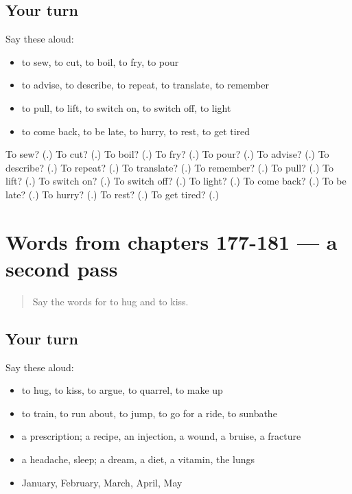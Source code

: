 \subsection*{Your turn}
Say these aloud:

\begin{itemize}
\raggedright
  \item to sew, to cut, to boil, to fry, to pour
  \item to advise, to describe, to repeat, to translate, to remember
  \item to pull, to lift, to switch on, to switch off, to light
  \item to come back, to be late, to hurry, to rest, to get tired
\end{itemize}

\begin{tcolorbox}[breakable,colback=teal!4,colframe=teal!35!black,title={Before you move on}]
To sew? (\textbf{}.) To cut? (\textbf{}.) To boil? (\textbf{}.) To fry? (\textbf{}.) To pour? (\textbf{}.) To advise? (\textbf{}.) To describe? (\textbf{}.) To repeat? (\textbf{}.) To translate? (\textbf{}.) To remember? (\textbf{}.) To pull? (\textbf{}.) To lift? (\textbf{}.) To switch on? (\textbf{}.) To switch off? (\textbf{}.) To light? (\textbf{}.) To come back? (\textbf{}.) To be late? (\textbf{}.) To hurry? (\textbf{}.) To rest? (\textbf{}.) To get tired? (\textbf{}.)
\end{tcolorbox}
\section[(dialogue)]{Words from chapters 177-181 — a second pass}

\label{lesson:RU-R181-second-pass-words-from-chapters-177-181}



\begin{quote}
Say the words for to hug and to kiss.
\end{quote}

\subsection*{Your turn}
Say these aloud:

\begin{itemize}
\raggedright
  \item to hug, to kiss, to argue, to quarrel, to make up
  \item to train, to run about, to jump, to go for a ride, to sunbathe
  \item a prescription; a recipe, an injection, a wound, a bruise, a fracture
  \item a headache, sleep; a dream, a diet, a vitamin, the lungs
  \item January, February, March, April, May
\end{itemize}

